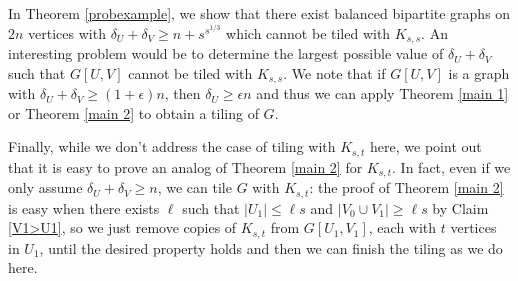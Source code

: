 \documentclass[oneside,12pt]{memoir}
\newcommand{\ep}{\epsilon}
\begin{document}
In Theorem \ref{probexample}, we show that there exist balanced bipartite graphs on $2n$ vertices with $\delta_U+\delta_V\geq n+s^{s^{1/3}}$ which cannot be tiled with $K_{s,s}$.  An interesting problem would be to determine the largest possible value of $\delta_U+\delta_V$ such that $G[U,V]$ cannot be tiled with $K_{s,s}$.  We note that if $G[U,V]$ is a graph with $\delta_U+\delta_V\geq (1+\ep)n$, then $\delta_U\geq \ep n$ and thus we can apply Theorem \ref{main 1} or Theorem \ref{main 2} to obtain a tiling of $G$.

Finally, while we don't address the case of tiling with $K_{s,t}$ here, we point out that it is easy to prove an analog of Theorem \ref{main 2} for $K_{s,t}$.  In fact, even if we only assume $\delta_U+\delta_V\geq n$, we can tile $G$ with $K_{s,t}$:  the proof of Theorem \ref{main 2} is easy when there exists $\ell$ such that $|U_1|\leq \ell s$ and $|V_0\cup V_1|\geq \ell s$ by Claim \ref{V1>U1}, so we just remove copies of $K_{s,t}$ from $G[U_1, V_1]$, each with $t$ vertices in $U_1$, until the desired property holds and then we can finish the tiling as we do here.



\clearpage


\newpage
 
\end{document}
